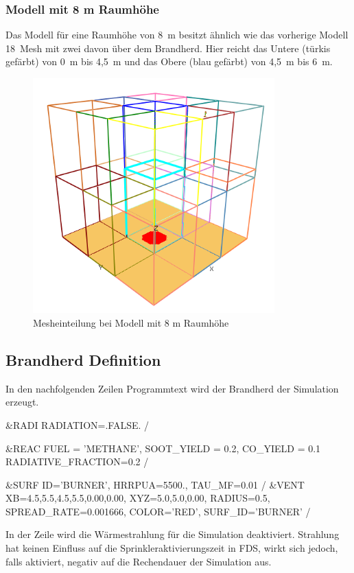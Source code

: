 \subsubsection{Modell mit 8 m Raumhöhe}
Das Modell für eine Raumhöhe von 8~m besitzt ähnlich wie das vorherige Modell 18~Mesh mit zwei davon über dem Brandherd. Hier reicht das Untere (türkis gefärbt) von 0~m bis 4,5~m und das Obere (blau gefärbt) von 4,5~m bis 6~m.
\begin{figure}
    \centering
    \includegraphics[width=0.83\textwidth]{images/8mRaumMesh.png}
    \caption{Mesheinteilung bei Modell mit 8 m Raumhöhe}
    \label{fig:8mRaumMesh}
\end{figure}

\FloatBarrier


\subsection{Brandherd Definition}
\label{sec:Brandherd}

In den nachfolgenden Zeilen Programmtext wird der Brandherd der Simulation erzeugt. 

\begin{GenericCode}[numbers=none]
&RADI RADIATION=.FALSE. /

&REAC FUEL = 'METHANE', SOOT_YIELD = 0.2, CO_YIELD = 0.1 RADIATIVE_FRACTION=0.2 /

&SURF ID='BURNER', HRRPUA=5500., TAU_MF=0.01 /
&VENT XB=4.5,5.5,4.5,5.5,0.00,0.00, XYZ=5.0,5.0,0.00, RADIUS=0.5, SPREAD_RATE=0.001666, COLOR='RED', SURF_ID='BURNER' /
\end{GenericCode}
In der  Zeile wird die Wärmestrahlung für die Simulation deaktiviert. Strahlung hat keinen Einfluss auf die Sprinkleraktivierungszeit in FDS, wirkt sich jedoch, falls aktiviert, negativ auf die Rechendauer der Simulation aus.


